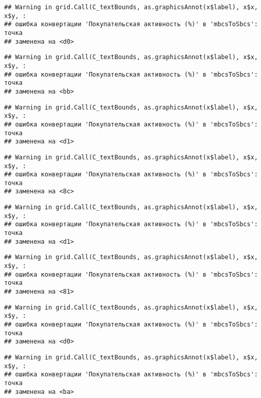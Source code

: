 \documentclass[
]{article}
\begin{document}
\begin{verbatim}
## Warning in grid.Call(C_textBounds, as.graphicsAnnot(x$label), x$x, x$y, :
## ошибка конвертации 'Покупательская активность (%)' в 'mbcsToSbcs': точка
## заменена на <d0>
\end{verbatim}

\begin{verbatim}
## Warning in grid.Call(C_textBounds, as.graphicsAnnot(x$label), x$x, x$y, :
## ошибка конвертации 'Покупательская активность (%)' в 'mbcsToSbcs': точка
## заменена на <bb>
\end{verbatim}

\begin{verbatim}
## Warning in grid.Call(C_textBounds, as.graphicsAnnot(x$label), x$x, x$y, :
## ошибка конвертации 'Покупательская активность (%)' в 'mbcsToSbcs': точка
## заменена на <d1>
\end{verbatim}

\begin{verbatim}
## Warning in grid.Call(C_textBounds, as.graphicsAnnot(x$label), x$x, x$y, :
## ошибка конвертации 'Покупательская активность (%)' в 'mbcsToSbcs': точка
## заменена на <8c>
\end{verbatim}

\begin{verbatim}
## Warning in grid.Call(C_textBounds, as.graphicsAnnot(x$label), x$x, x$y, :
## ошибка конвертации 'Покупательская активность (%)' в 'mbcsToSbcs': точка
## заменена на <d1>
\end{verbatim}

\begin{verbatim}
## Warning in grid.Call(C_textBounds, as.graphicsAnnot(x$label), x$x, x$y, :
## ошибка конвертации 'Покупательская активность (%)' в 'mbcsToSbcs': точка
## заменена на <81>
\end{verbatim}

\begin{verbatim}
## Warning in grid.Call(C_textBounds, as.graphicsAnnot(x$label), x$x, x$y, :
## ошибка конвертации 'Покупательская активность (%)' в 'mbcsToSbcs': точка
## заменена на <d0>
\end{verbatim}

\begin{verbatim}
## Warning in grid.Call(C_textBounds, as.graphicsAnnot(x$label), x$x, x$y, :
## ошибка конвертации 'Покупательская активность (%)' в 'mbcsToSbcs': точка
## заменена на <ba>
\end{verbatim}
\end{document}
